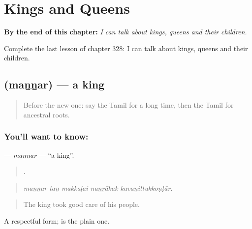 
\chapter{Kings and Queens}
\label{ch:ta-kings-and-queens}

\begin{chapteropening}
\textbf{By the end of this chapter:} \emph{I can talk about kings, queens and their children.}

Complete the last lesson of chapter 328: I can talk about kings, queens and their children.
\end{chapteropening}

\section[\texorpdfstring{\ta{மன்னர்} (maṉṉar)}{மன்னர் (maṉṉar)}]{ (maṉṉar) — a king}

\label{lesson:TA-C328-mannar}



\begin{quote}
Before the new one: say the Tamil for a long time, then the Tamil for ancestral roots.
\end{quote}

\subsection*{You'll want to know: }
\textbf{} — \emph{maṉṉar} — \textquotedblleft{}a king\textquotedblright{}.

\begin{quote}
    .
\end{quote}

\begin{quote}
\emph{maṉṉar taṉ makkaḷai naṉṟākak kavaṉittukkoṇṭār.}
\end{quote}

\begin{quote}
The king took good care of his people.
\end{quote}

A respectful form;  is the plain one.

